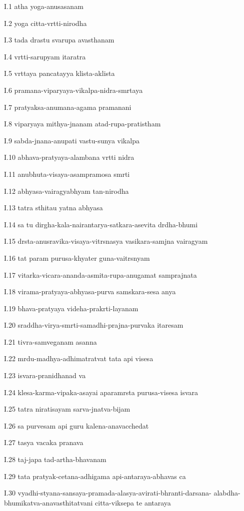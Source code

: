 I.1
atha yoga-anusasanam

I.2
yoga citta-vrtti-nirodha

I.3
tada drastu svarupa avasthanam

I.4
vrtti-sarupyam itaratra

I.5
vrttaya pancatayya klista-aklista

I.6
pramana-viparyaya-vikalpa-nidra-smrtaya

I.7
pratyaksa-anumana-agama pramanani

I.8
viparyaya mithya-jnanam atad-rupa-pratistham

I.9
sabda-jnana-anupati vastu-sunya vikalpa

I.10
abhava-pratyaya-alambana vrtti nidra

I.11
anubhuta-visaya-asampramosa smrti

I.12
abhyasa-vairagyabhyam tan-nirodha

I.13
tatra sthitau yatna abhyasa

I.14
sa tu dirgha-kala-nairantarya-satkara-asevita drdha-bhumi

I.15
drsta-anusravika-visaya-vitrsnasya vasikara-samjna vairagyam

I.16
tat param purusa-khyater guna-vaitrsnyam

I.17
vitarka-vicara-ananda-asmita-rupa-anugamat samprajnata

I.18
virama-pratyaya-abhyasa-purva samskara-sesa anya

I.19
bhava-pratyaya videha-prakrti-layanam

I.20
sraddha-virya-smrti-samadhi-prajna-purvaka itaresam

I.21
tivra-samveganam asanna

I.22
mrdu-madhya-adhimatratvat tata api visesa

I.23
isvara-pranidhanad va

I.24
klesa-karma-vipaka-asayai aparamrsta purusa-visesa isvara

I.25
tatra niratisayam sarva-jnatva-bijam

I.26
sa purvesam api guru kalena-anavacchedat

I.27
tasya vacaka pranava

I.28
taj-japa tad-artha-bhavanam

I.29
tata pratyak-cetana-adhigama api-antaraya-abhavas ca

I.30
vyadhi-styana-sansaya-pramada-alasya-avirati-bhranti-darsana-
alabdha-bhumikatva-anavasthitatvani citta-viksepa te antaraya

